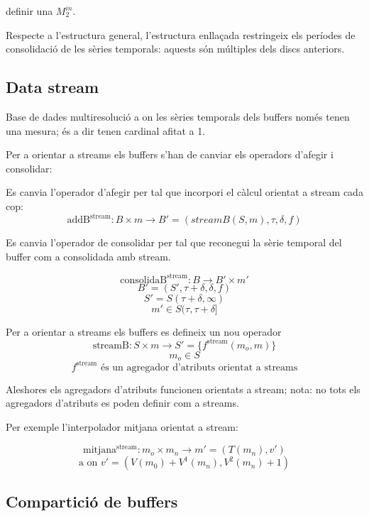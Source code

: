 
definir una $M^{in}_2$.





Respecte a l'estructura general, l'estructura enllaçada restringeix
els períodes de consolidació de les sèries temporals: aquests són
múltiples dels discs anteriors.



\subsection{Data stream}



Base de dades multiresolució a on les sèries temporals dels buffers
només tenen una mesura; és a dir tenen cardinal afitat a 1.


Per a orientar a streams els buffers s'han de canviar els operadors
d'afegir i consolidar:

Es canvia l'operador d'afegir per tal que incorpori el càlcul orientat
a stream cada cop:
\[
\text{addB}^{\text{stream}}: B \times m \longrightarrow B' =
(streamB(S,m),\tau,\delta,f)
\]

Es canvia l'operador de consolidar per tal que reconegui la sèrie
temporal del buffer com a consolidada amb stream.

  \[
  \text{consolidaB}^{\text{stream}}: B \longrightarrow B' \times m'
  \]
  \[
  B'= (S',\tau+\delta,\delta,f)
  \]
  \[
  S' = S(\tau+\delta,\infty)
  \]
  \[
  m' \in S(\tau,\tau+\delta] 
  \]


Per a orientar a streams els buffers es defineix un nou operador
\[
\text{streamB}: S \times m \longrightarrow S' = \{f^{\text{stream}}(m_o,m)\}
\]
\[
m_o \in S
\]
\[
f^{\text{stream}} \text{ és un agregador d'atributs orientat a streams}
\]
 

Aleshores els agregadors d'atributs funcionen orientats a stream;
nota: no tots els agregadors d'atributs es poden definir com a
streams.


Per exemple l'interpolador mitjana orientat a stream:

\[
\text{mitjana}^{\text{stream}}: m_o \times m_n \longrightarrow m' = (T(m_n),v')
\]
\[
\text{a on } v' = (V(m_0) + V^1(m_n), V^2(m_n) + 1 )
\]


\subsection{Compartició de buffers}


